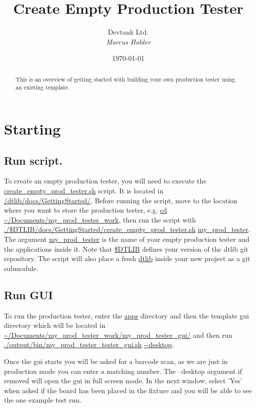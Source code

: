 \documentclass[a4paper,12pt, notitlepage]{article}
\begin{document}
\title{\textbf{\large{Create Empty Production Tester}}}

\author{\normalsize{Devtank Ltd.} \\
        \small\textit{
        Marcus Holder}}
\date{\today}

\maketitle 
\thispagestyle{fancy}


\begin{abstract} 
\noindent
This is an overview of getting started with building your own production tester using an existing template.
\end{abstract}
\vspace{11mm}

\newpage
\tableofcontents
\newpage


\section{Starting}
\label{sec: start}

\subsection{Run script.}
\label{renameStart}

To create an empty production tester, you will need to execute the \url{create_empty_prod_tester.sh} script. It is located in \url{/dtlib/docs/GettingStarted/}. Before running the script, move to the location where you want to store the production tester, e.g. \url{cd ~/Documents/my_prod_tester_work}, then run the script with \url{./$DTLIB/docs/GettingStarted/create_empty_prod_tester.sh} \url{my_prod_tester}. The argument \url{my_prod_tester} is the name of your empty production tester and the applications inside it. Note that \url{$DTLIB} defines your version of the dtlib git repository. The script will also place a fresh \url{dtlib} inside your new project as a git submodule. 

\subsection{Run GUI}

To run the production tester, enter the \url{apps} directory and then the template gui directory which will be located in \url{~/Documents/my_prod_tester_work/my_prod_tester_gui/} and then run \url{./output/bin/my_prod_tester_tester_gui.sh} \url{--desktop}.

Once the gui starts you will be asked for a barcode scan, as we are just in production mode you can enter a matching number. The --desktop argument if removed will open the gui in full screen mode. In the next window, select 'Yes' when asked if the board has been placed in the fixture and you will be able to see the one example test run.
\end{document}
